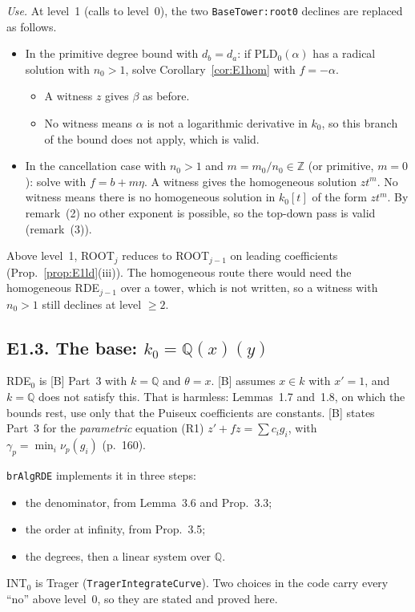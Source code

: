 \documentclass[11pt]{article}
\theoremstyle{definition}
\theoremstyle{remark}
\newcommand{\Q}{\mathbb{Q}}
\newcommand{\Z}{\mathbb{Z}}
\newcommand{\code}[1]{\texttt{#1}}
\begin{document}
\noindent \emph{Use.} At level~1 (calls to level~0), the two \code{BaseTower:root0} declines are
replaced as follows.
\begin{itemize}
\item In the primitive degree bound with $d_b=d_a$: if PLD$_0(\alpha)$ has a radical solution
  with $n_0>1$, solve Corollary~\ref{cor:E1hom} with $f=-\alpha$.
  \begin{itemize}
  \item A witness $z$ gives $\beta$ as before.
  \item No witness means $\alpha$ is not a logarithmic derivative in $k_0$, so this branch of
    the bound does not apply, which is valid.
  \end{itemize}
\item In the cancellation case with $n_0>1$ and $m=m_0/n_0\in\Z$ (or primitive, $m=0$): solve
  with $f=b+m\eta$. A witness gives the homogeneous solution $zt^m$. No witness means there is
  no homogeneous solution in $k_0[t]$ of the form $zt^m$. By remark~(2) no other exponent is
  possible, so the top-down pass is valid (remark~(3)).
\end{itemize}
Above level~1, ROOT$_j$ reduces to ROOT$_{j-1}$ on leading coefficients (Prop.~\ref{prop:E1ld}(iii)).
The homogeneous route there would need the homogeneous RDE$_{j-1}$ over a tower, which is not
written, so a witness with $n_0>1$ still declines at level $\ge2$.

\subsection*{E1.3. The base: $k_0=\Q(x)(y)$}

RDE$_0$ is [B] Part~3 with $k=\Q$ and $\theta=x$. [B] assumes $x\in k$ with $x'=1$, and $k=\Q$
does not satisfy this. That is harmless: Lemmas~1.7 and~1.8, on which the bounds rest, use only
that the Puiseux coefficients are constants. [B] states Part~3 for the \emph{parametric}
equation (R1) $z'+fz=\sum c_ig_i$, with $\gamma_p=\min_i\nu_p(g_i)$ (p.~160).

\code{brAlgRDE} implements it in three steps:
\begin{itemize}
\item the denominator, from Lemma~3.6 and Prop.~3.3;
\item the order at infinity, from Prop.~3.5;
\item the degrees, then a linear system over $\Q$.
\end{itemize}
INT$_0$ is Trager (\code{TragerIntegrateCurve}). Two choices in the code carry every ``no''
above level~0, so they are stated and proved here.
\end{document}
